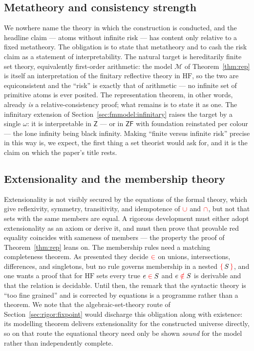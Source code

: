 \subsection{Metatheory and consistency strength}
\label{sec:rigor:meta}

We nowhere name the theory in which the construction is conducted, and the
headline
claim --- atoms without infinite risk --- has content only relative to a fixed
metatheory. The obligation is to state that metatheory and to cash the risk claim
as a statement of interpretability. The natural target is hereditarily finite set
theory, equivalently first-order arithmetic: the model $\mathcal{M}$ of
Theorem~\ref{thm:rep} is itself an interpretation of the finitary reflective
theory in $\mathrm{HF}$, so the two are equiconsistent and the ``risk'' is exactly
that of arithmetic --- no infinite set of primitive atoms is ever posited. The
representation theorem, in other words, already \emph{is} a relative-consistency
proof; what remains is to state it as one. The infinitary extension of
Section~\ref{sec:fmmodel:infinitary} raises the target by a single $\omega$: it is
interpretable in $\mathsf{Z}$ --- or in $\mathsf{ZF}$ with foundation reinstated
per colour --- the lone infinity being black infinity. Making ``finite versus
infinite risk'' precise in this way is, we expect, the first thing a set theorist
would ask for, and it is the claim on which the paper's title rests.

\subsection{Extensionality and the membership theory}
\label{sec:rigor:ext}

Extensionality is not visibly secured by the equations of the formal theory, which
give reflexivity, symmetry, transitivity, and idempotence of $\mathbin{\textcolor{red}{\cup}}$ and $\mathbin{\textcolor{red}{\cap}}$,
but not that sets with the same members are equal. A rigorous development must
either adopt extensionality as an axiom or derive it, and must then prove that
provable red equality coincides with sameness of members --- the property the
proof of Theorem~\ref{thm:rep} leans on. The membership rules need a matching
completeness theorem. As presented they decide $\mathrel{\textcolor{red}{\in}}$ on unions, intersections,
differences, and singletons, but no rule governs membership in a nested
$\textcolor{red}{\{}\,S\,\textcolor{red}{\}}$, and one wants a proof that for $\mathrm{HF}$ sets every true $e\mathrel{\textcolor{red}{\in}} S$
and $e\mathrel{\textcolor{red}{\notin}} S$ is derivable and that the relation is decidable. Until then, the
remark that the syntactic theory is ``too fine grained'' and is corrected by
equations is a programme rather than a theorem. We note that the
algebraic-set-theory route of Section~\ref{sec:rigor:fixpoint} would discharge
this obligation along with existence: its modelling theorem delivers
extensionality for the constructed universe directly, so on that route the
equational theory need only be shown \emph{sound} for the model rather than
independently complete.

